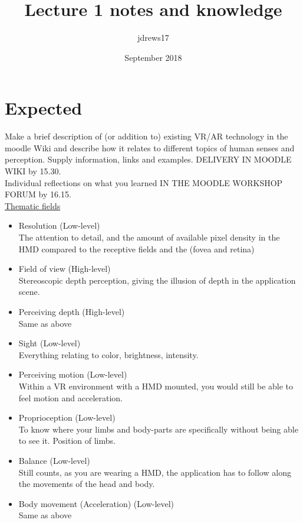 \documentclass{article}
\title{Lecture 1 notes and knowledge}
\author{jdrews17}
\date{September 2018}
\begin{document}
\maketitle
\newpage


\section{Expected}
Make a brief description of (or addition to) existing VR/AR technology  in the moodle Wiki and describe how it relates to different topics of human senses and perception.  Supply information, links and examples. DELIVERY IN MOODLE WIKI by 15.30.\\

Individual reflections on what you learned IN THE MOODLE WORKSHOP FORUM by 16.15.\\

\underline{Thematic fields}
\begin{itemize}
  \item Resolution (Low-level)\\
    The attention to detail, and the amount of available pixel density in the HMD compared to the receptive fields and the (fovea and retina)
  \item Field of view (High-level)\\
    Stereoscopic depth perception, giving the illusion of depth in the application scene.
  \item Perceiving depth (High-level)\\
    Same as above
  \item Sight (Low-level)\\
    Everything relating to color, brightness, intensity.

  \item Perceiving motion (Low-level)\\
    Within a VR environment with a HMD mounted, you would still be able to feel motion and acceleration.

  \item Proprioception (Low-level)\\
    To know where your limbs and body-parts are specifically without being able to see it. Position of limbs.

  \item Balance (Low-level)\\
    Still counts, as you are wearing a HMD, the application has to follow along the movements of the head and body.

  \item Body movement (Acceleration) (Low-level)\\
    Same as above

\end{itemize}
\end{document}
